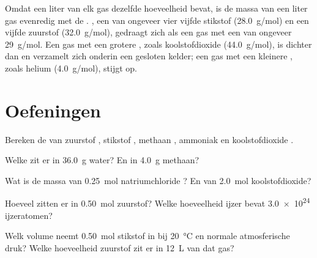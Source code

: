 \begin{remark}\label{rem:g10:the-mole:heavy}
Omdat een liter van elk gas dezelfde hoeveelheid bevat, is de massa van
een liter gas evenredig met de . , een  van
ongeveer vier vijfde stikstof (\qty{28.0}{g/mol}) en een vijfde zuurstof
(\qty{32.0}{g/mol}), gedraagt zich als een gas met een  van
ongeveer \qty{29}{g/mol}. Een gas met een grotere , zoals
koolstofdioxide (\qty{44.0}{g/mol}), is dichter dan  en verzamelt
zich onderin een gesloten kelder; een gas met een kleinere ,
zoals helium (\qty{4.0}{g/mol}), stijgt op.
\end{remark}

\section{Oefeningen}

\begin{exercise}[$\star$]\label{exo:g10:the-mole:1}
Bereken de  van zuurstof , stikstof ,
methaan , ammoniak  en koolstofdioxide .
\end{exercise}

\begin{exercise}[$\star$]\label{exo:g10:the-mole:2}
Welke  zit er in \qty{36.0}{g} water? En in
\qty{4.0}{g} methaan?
\end{exercise}

\begin{exercise}[$\star$]\label{exo:g10:the-mole:3}
Wat is de massa van \qty{0.25}{mol} natriumchloride ? En van
\qty{2.0}{mol} koolstofdioxide?
\end{exercise}

\begin{exercise}[$\star$]\label{exo:g10:the-mole:4}
Hoeveel  zitten er in \qty{0.50}{mol} zuurstof? Welke
hoeveelheid ijzer bevat \num{3.0e24} ijzeratomen?
\end{exercise}

\begin{exercise}[$\star$]\label{exo:g10:the-mole:5}
Welk volume neemt \qty{0.50}{mol} stikstof in bij \qty{20}{\celsius} en
normale atmosferische druk? Welke hoeveelheid zuurstof zit er in
\qty{12}{L} van dat gas?
\end{exercise}

